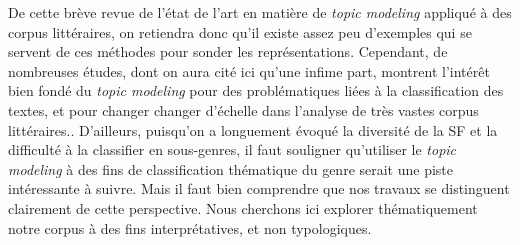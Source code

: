 \documentclass[letterpaper,portrait,12pt]{article}
\begin{document}
	De cette br\`{e}ve revue de l'\'{e}tat de l'art en mati\`{e}re de \emph{topic modeling} appliqu\'{e} \`{a} des corpus litt\'{e}raires, on retiendra donc qu'il existe assez peu d'exemples qui se servent de ces m\'{e}thodes pour sonder les repr\'{e}sentations. Cependant, de nombreuses \'{e}tudes, dont on aura cit\'{e} ici qu'une infime part, montrent l'int\'{e}r\^{e}t bien fond\'{e} du \emph{topic modeling} pour des probl\'{e}matiques li\'{e}es \`{a} la classification des textes, et pour changer changer d'\'{e}chelle dans l'analyse de tr\`{e}s vastes corpus litt\'{e}raires.. D'ailleurs, puisqu'on a longuement \'{e}voqu\'{e} la diversit\'{e} de la SF et la difficult\'{e} \`{a} la classifier en sous-genres, il faut souligner qu'utiliser le \emph{topic modeling} \`{a} des fins de classification th\'{e}matique du genre serait une piste int\'{e}ressante \`{a} suivre. Mais il faut bien comprendre que nos travaux se distinguent clairement de cette perspective. Nous cherchons ici explorer th\'{e}matiquement notre corpus \`{a} des fins interpr\'{e}tatives, et non typologiques.
\end{document}
